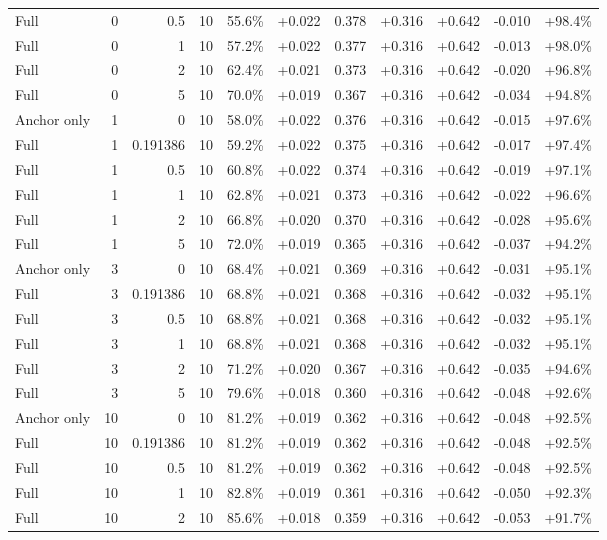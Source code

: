 \begin{table}[htbp]
\begin{tabular}{lrrrccccccc}
Full & 0 & 0.5 & 10 & 55.6\% & +0.022 & 0.378 & +0.316 & +0.642 & -0.010 & +98.4\% \\
Full & 0 & 1 & 10 & 57.2\% & +0.022 & 0.377 & +0.316 & +0.642 & -0.013 & +98.0\% \\
Full & 0 & 2 & 10 & 62.4\% & +0.021 & 0.373 & +0.316 & +0.642 & -0.020 & +96.8\% \\
Full & 0 & 5 & 10 & 70.0\% & +0.019 & 0.367 & +0.316 & +0.642 & -0.034 & +94.8\% \\
Anchor only & 1 & 0 & 10 & 58.0\% & +0.022 & 0.376 & +0.316 & +0.642 & -0.015 & +97.6\% \\
Full & 1 & 0.191386 & 10 & 59.2\% & +0.022 & 0.375 & +0.316 & +0.642 & -0.017 & +97.4\% \\
Full & 1 & 0.5 & 10 & 60.8\% & +0.022 & 0.374 & +0.316 & +0.642 & -0.019 & +97.1\% \\
Full & 1 & 1 & 10 & 62.8\% & +0.021 & 0.373 & +0.316 & +0.642 & -0.022 & +96.6\% \\
Full & 1 & 2 & 10 & 66.8\% & +0.020 & 0.370 & +0.316 & +0.642 & -0.028 & +95.6\% \\
Full & 1 & 5 & 10 & 72.0\% & +0.019 & 0.365 & +0.316 & +0.642 & -0.037 & +94.2\% \\
Anchor only & 3 & 0 & 10 & 68.4\% & +0.021 & 0.369 & +0.316 & +0.642 & -0.031 & +95.1\% \\
Full & 3 & 0.191386 & 10 & 68.8\% & +0.021 & 0.368 & +0.316 & +0.642 & -0.032 & +95.1\% \\
Full & 3 & 0.5 & 10 & 68.8\% & +0.021 & 0.368 & +0.316 & +0.642 & -0.032 & +95.1\% \\
Full & 3 & 1 & 10 & 68.8\% & +0.021 & 0.368 & +0.316 & +0.642 & -0.032 & +95.1\% \\
Full & 3 & 2 & 10 & 71.2\% & +0.020 & 0.367 & +0.316 & +0.642 & -0.035 & +94.6\% \\
Full & 3 & 5 & 10 & 79.6\% & +0.018 & 0.360 & +0.316 & +0.642 & -0.048 & +92.6\% \\
Anchor only & 10 & 0 & 10 & 81.2\% & +0.019 & 0.362 & +0.316 & +0.642 & -0.048 & +92.5\% \\
Full & 10 & 0.191386 & 10 & 81.2\% & +0.019 & 0.362 & +0.316 & +0.642 & -0.048 & +92.5\% \\
Full & 10 & 0.5 & 10 & 81.2\% & +0.019 & 0.362 & +0.316 & +0.642 & -0.048 & +92.5\% \\
Full & 10 & 1 & 10 & 82.8\% & +0.019 & 0.361 & +0.316 & +0.642 & -0.050 & +92.3\% \\
Full & 10 & 2 & 10 & 85.6\% & +0.018 & 0.359 & +0.316 & +0.642 & -0.053 & +91.7\% \\

\end{tabular}
\end{table}
